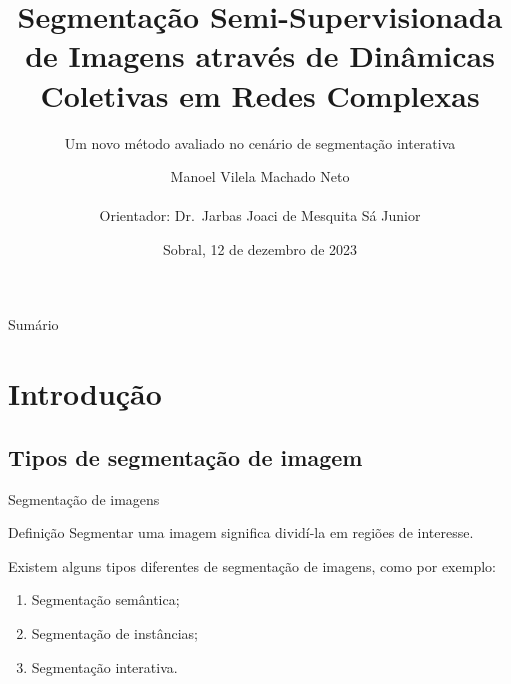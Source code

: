 \documentclass{templatebeamerufc/libs/ufc_format}
\title[EGSIS]{\textbf{Segmentação Semi-Supervisionada de Imagens através de
Dinâmicas Coletivas em Redes Complexas}}
\subtitle{Um novo método avaliado no cenário de segmentação interativa}
\author[Manoel Vilela Machado Neto]{
  Manoel Vilela Machado Neto
  \\~\\
  Orientador: Dr.\ Jarbas Joaci de Mesquita Sá Junior
}
\institute[UFC]{
    \normalsize{\email{manoel.machado@alu.ufc.br}}
    \newline
    \department{Engenharia da Computação}
    \newline
    \ufc{}
}
\date{Sobral, 12 de dezembro de 2023}
\begin{document}

\begin{frame}{}
    \maketitle
\end{frame}

\begin{frame}[allowframebreaks]{Sumário}
  \tableofcontents[sections={1---2}]  %
    \framebreak{}
  \tableofcontents[sections={3---5}]  %
\end{frame}

\section{Introdução}

\subsection{Tipos de segmentação de imagem}

\begin{frame}{Segmentação de imagens}
  \begin{block}{Definição}
    Segmentar uma imagem significa dividí-la em regiões de interesse.
  \end{block}

  Existem alguns tipos diferentes de segmentação de imagens, como por
exemplo:
  \begin{enumerate}
    \item Segmentação semântica;
    \item Segmentação de instâncias;
    \item Segmentação interativa.
  \end{enumerate}
\end{frame}
\end{document}
